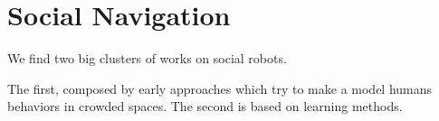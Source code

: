 \section{Social Navigation}\label{sec: social robots}

We find two big clusters of works on social robots.

The first, composed by early approaches which try to make a model humans behaviors in crowded spaces.
%
The second is based on learning methods.





